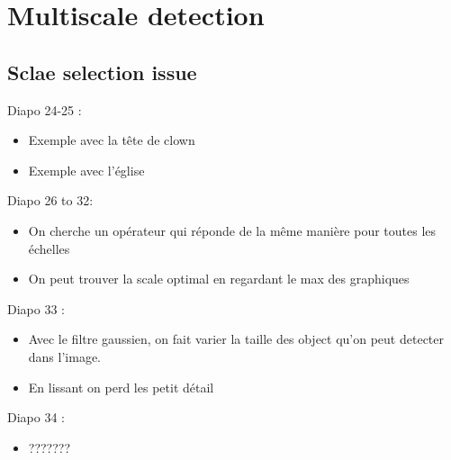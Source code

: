 \documentclass{article}
\theoremstyle{plain}%
\theoremstyle{definition}
\theoremstyle{remark}
\begin{document}
\section{Multiscale detection}
\subsection{Sclae selection issue}
Diapo 24-25 : 
\begin{itemize}
    \item Exemple avec la tête de clown
    \item Exemple avec l'église
\end{itemize}
Diapo 26 to 32: 
\begin{itemize}
    \item On cherche un opérateur qui réponde de la même manière pour toutes les échelles
    \item On peut trouver la scale optimal en regardant le max des graphiques
\end{itemize}
Diapo 33 :
\begin{itemize}
    \item Avec le filtre gaussien, on fait varier la taille des object qu'on peut detecter dans l'image.
    \item En lissant on perd les petit détail 
\end{itemize}
Diapo 34 : \begin{itemize}
    \item ???????
\end{itemize}
\end{document}
